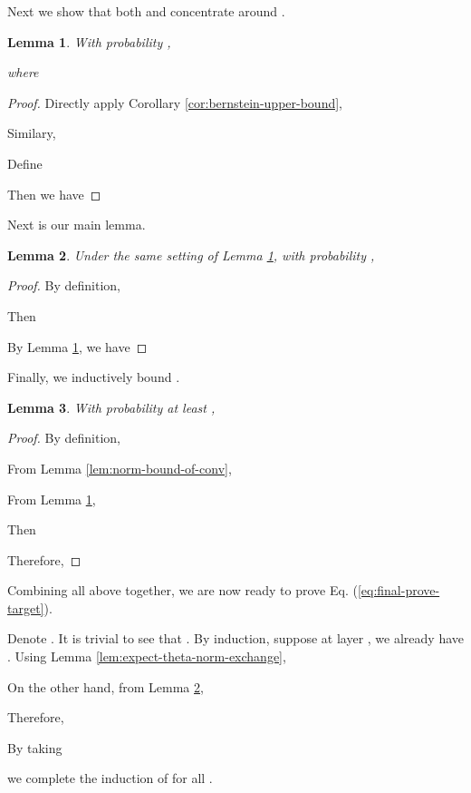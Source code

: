 \documentclass{article}
\newtheorem{lem}{Lemma}
\begin{document}
Next we show that both  and 
concentrate around .
\begin{lem}
\label{lem:sigma-i-concentration} With probability
, 

where

\end{lem}

\begin{proof}
Directly apply Corollary \ref{cor:bernstein-upper-bound},


Similary,


Define

Then we have

\end{proof}
Next is our main lemma.
\begin{lem}
\label{lem:sigma-xtp1-equal-gt-norm}
Under the same setting of Lemma \ref{lem:sigma-i-concentration}, with probability ,

\end{lem}

\begin{proof}
By definition,

Then

By Lemma \ref{lem:sigma-i-concentration}, we have

\end{proof}
Finally, we inductively bound .
\begin{lem}
\label{lem:upper-bound-x-t} With probability at least ,

\end{lem}

\begin{proof}
By definition,


From Lemma \ref{lem:norm-bound-of-conv},


From Lemma \ref{lem:sigma-i-concentration}, 



Then

Therefore, 

\end{proof}
Combining all above together, we are now ready to prove Eq. (\ref{eq:final-prove-target}).

Denote . It is trivial to see that .
By induction, suppose at layer , we already have .
Using Lemma \ref{lem:expect-theta-norm-exchange},


On the other hand, from Lemma \ref{lem:sigma-xtp1-equal-gt-norm},

Therefore,

By taking 

we complete the induction of 
for all .
\end{document}
